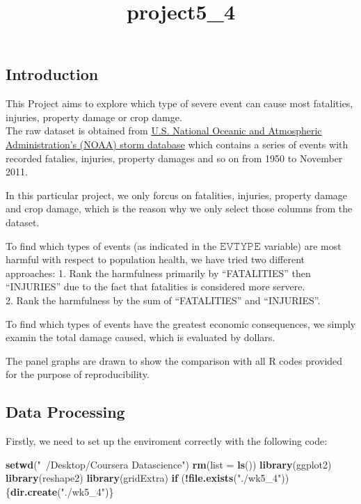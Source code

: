 \documentclass[]{article}
\title{project5\_4}
\author{}
\date{}
\newenvironment{Shaded}{\begin{snugshade}}{\end{snugshade}}
\newcommand{\KeywordTok}[1]{\textcolor[rgb]{0.13,0.29,0.53}{\textbf{#1}}}
\newcommand{\DataTypeTok}[1]{\textcolor[rgb]{0.13,0.29,0.53}{#1}}
\newcommand{\StringTok}[1]{\textcolor[rgb]{0.31,0.60,0.02}{#1}}
\newcommand{\ControlFlowTok}[1]{\textcolor[rgb]{0.13,0.29,0.53}{\textbf{#1}}}
\newcommand{\OperatorTok}[1]{\textcolor[rgb]{0.81,0.36,0.00}{\textbf{#1}}}
\newcommand{\NormalTok}[1]{#1}
\begin{document}
\maketitle

\subsection{Introduction}\label{introduction}

This Project aims to explore which type of severe event can cause most
fatalities, injuries, property damage or crop damge.\\
The raw dataset is obtained from
\href{https://d396qusza40orc.cloudfront.net/repdata\%2Fdata\%2FStormData.csv.bz2}{U.S.
National Oceanic and Atmospheric Administration's (NOAA) storm database}
which contains a series of events with recorded fatalies, injuries,
property damages and so on from 1950 to November 2011.

In this particular project, we only forcus on fatalities, injuries,
property damage and crop damage, which is the reason why we only select
those columns from the dataset.

To find which types of events (as indicated in the 𝙴𝚅𝚃𝚈𝙿𝙴 variable) are
most harmful with respect to population health, we have tried two
different approaches: 1. Rank the harmfulness primarily by
``FATALITIES'' then ``INJURIES'' due to the fact that fatalities is
considered more servere.\\
2. Rank the harmfulness by the sum of ``FATALITIES'' and ``INJURIES''.

To find which types of events have the greatest economic consequences,
we simply examin the total damage caused, which is evaluated by dollars.

The panel graphs are drawn to show the comparison with all R codes
provided for the purpose of reproducibility.

\subsection{Data Processing}\label{data-processing}

Firstly, we need to set up the enviroment correctly with the following
code:

\begin{Shaded}
\begin{Highlighting}[]
\KeywordTok{setwd}\NormalTok{(}\StringTok{"~/Desktop/Coursera Datascience"}\NormalTok{)}
\KeywordTok{rm}\NormalTok{(}\DataTypeTok{list =} \KeywordTok{ls}\NormalTok{())}
\KeywordTok{library}\NormalTok{(ggplot2)}
\KeywordTok{library}\NormalTok{(reshape2)}
\KeywordTok{library}\NormalTok{(gridExtra)}
\ControlFlowTok{if}\NormalTok{ (}\OperatorTok{!}\KeywordTok{file.exists}\NormalTok{(}\StringTok{"./wk5_4"}\NormalTok{)) \{}\KeywordTok{dir.create}\NormalTok{(}\StringTok{"./wk5_4"}\NormalTok{)\}}
\end{Highlighting}
\end{Shaded}
\end{document}
